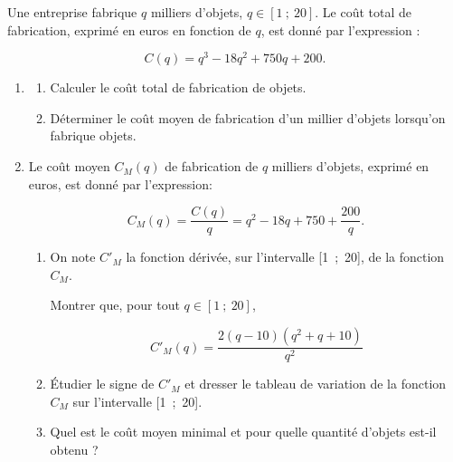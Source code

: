 \medskip

Une entreprise fabrique $q$ milliers d'objets, $q \in [1~;~20]$. Le coût total de fabrication, exprimé en euros en fonction de $q$, est donné par l'expression :

\[C(q) = q^3 - 18q^2 +750q + 200.\]

\begin{enumerate}
\item 
	\begin{enumerate}
		\item Calculer le coût total de fabrication de  objets.
		\item Déterminer le coût moyen de fabrication d'un millier d'objets lorsqu'on fabrique  objets.
	\end{enumerate}
\item Le coût moyen $C_M(q)$ de fabrication de $q$ milliers d'objets, exprimé en euros, est donné par l'expression:

\[C_M(q) = \dfrac{C(q)}{q}   = q^2 - 18q + 750 + \dfrac{ 200}{q}.\]
 
	\begin{enumerate}
		\item On note $C'_M$ la fonction dérivée, sur l'intervalle [1~;~20], de la fonction $C_M$.
		
 Montrer que, pour tout $q \in [1~;~20]$,

\[C'_M(q) = \dfrac{2(q - 10)\left(q^2 + q + 10\right)}{q^2}\]

		\item Étudier le signe de $C'_M$ et dresser le tableau de variation de la fonction $C_M$ sur l'intervalle [1~;~20].
		\item Quel est le coût moyen minimal et pour quelle quantité d'objets est-il obtenu ?
	\end{enumerate}
\end{enumerate}

\bigskip
